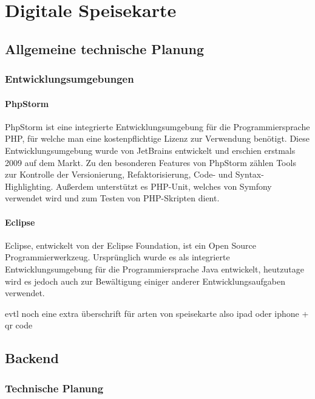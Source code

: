 \chapter{Digitale Speisekarte}
\renewcommand{\kapitelautor}{Autor: Katharina Joksch}

\section{Allgemeine technische Planung}

  \subsection{Entwicklungsumgebungen}

    \subsubsection{PhpStorm}
PhpStorm ist eine integrierte Entwicklungsumgebung für die Programmiersprache PHP, für welche man eine kostenpflichtige Lizenz zur Verwendung benötigt. Diese Entwicklungsumgebung wurde von JetBrains entwickelt und erschien erstmals 2009 auf dem Markt. Zu den besonderen Features von PhpStorm zählen Tools zur Kontrolle der Versionierung, Refaktorisierung, Code- und Syntax-Highlighting. Außerdem unterstützt es PHP-Unit, welches von Symfony verwendet wird und zum Testen von PHP-Skripten dient.

    \subsubsection{Eclipse}

Eclipse, entwickelt von der Eclipse Foundation, ist ein Open Source Programmierwerkzeug. Ursprünglich wurde es als integrierte Entwicklungsumgebung für die Programmiersprache Java entwickelt, heutzutage wird es jedoch auch zur Bewältigung einiger anderer Entwicklungsaufgaben verwendet.

evtl noch eine extra überschrift für arten von speisekarte also ipad oder iphone + qr code

\section{Backend}

  \subsection{Technische Planung}

